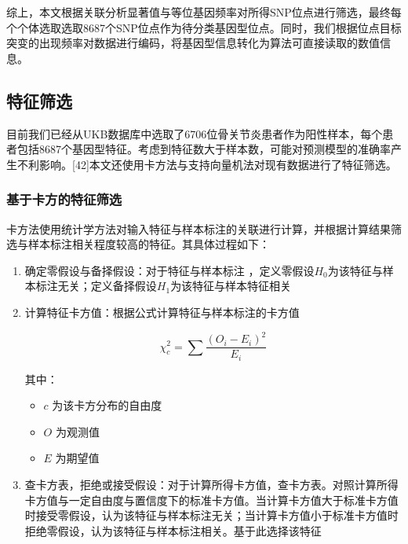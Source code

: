 \documentclass[
]{article}
\begin{document}
综上，本文根据关联分析显著值与等位基因频率对所得SNP位点进行筛选，最终每个个体选取选取8687个SNP位点作为待分类基因型位点。同时，我们根据位点目标突变的出现频率对数据进行编码，将基因型信息转化为算法可直接读取的数值信息。

\hypertarget{ux7279ux5f81ux7b5bux9009}{%
\subsection{特征筛选}\label{ux7279ux5f81ux7b5bux9009}}

目前我们已经从UKB数据库中选取了6706位骨关节炎患者作为阳性样本，每个患者包括8687个基因型特征。考虑到特征数大于样本数，可能对预测模型的准确率产生不利影响。{[}42{]}本文还使用卡方法与支持向量机法对现有数据进行了特征筛选。

\hypertarget{ux57faux4e8eux5361ux65b9ux7684ux7279ux5f81ux7b5bux9009}{%
\subsubsection{基于卡方的特征筛选}\label{ux57faux4e8eux5361ux65b9ux7684ux7279ux5f81ux7b5bux9009}}

卡方法使用统计学方法对输入特征与样本标注的关联进行计算，并根据计算结果筛选与样本标注相关程度较高的特征。其具体过程如下：

\begin{enumerate}
\def\labelenumi{\arabic{enumi}.}
\item
  确定零假设与备择假设：对于特征与样本标注
  ，定义零假设\(H_0\)为该特征与样本标注无关；定义备择假设\(H_1\)为该特征与样本特征相关
\item
  计算特征卡方值：根据公式计算特征与样本标注的卡方值

  \[\chi_c^2=\sum \frac{(O_{i}-E_i)^2}{E_i}\]

  其中：

  \begin{itemize}
  \item
    \(c\) 为该卡方分布的自由度
  \item
    \(O\) 为观测值
  \item
    \(E\) 为期望值
  \end{itemize}
\item
  查卡方表，拒绝或接受假设：对于计算所得卡方值，查卡方表。对照计算所得卡方值与一定自由度与置信度下的标准卡方值。当计算卡方值大于标准卡方值时接受零假设，认为该特征与样本标注无关；当计算卡方值小于标准卡方值时拒绝零假设，认为该特征与样本标注相关。基于此选择该特征
\end{enumerate}
\end{document}
